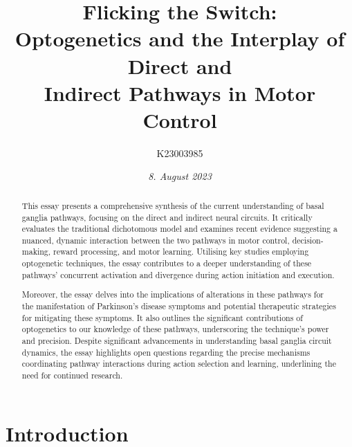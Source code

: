 \documentclass[10pt]{article}
\title{\textbf{Flicking the Switch: } \\ Optogenetics and the Interplay of Direct and \\ Indirect Pathways in Motor Control}
\author[ ]{K23003985}
\affil[ ]{\textbf{King’s College London}}
\affil[ ]{\href{mailto:K23003985@kcl.ac.uk}{K23003985@kcl.ac.uk}}
\date{\textit{8. August 2023}}
\begin{document}

\maketitle
\thispagestyle{empty}

\doublespacing

\begin{sloppypar} %
  \begin{abstract}
    This essay presents a comprehensive synthesis of the current understanding of basal ganglia pathways, focusing on the direct and indirect neural circuits. It critically evaluates the traditional dichotomous model and examines recent evidence suggesting a nuanced, dynamic interaction between the two pathways in motor control, decision-making, reward processing, and motor learning. Utilising key studies employing optogenetic techniques, the essay contributes to a deeper understanding of these pathways’ concurrent activation and divergence during action initiation and execution.

    Moreover, the essay delves into the implications of alterations in these pathways for the manifestation of Parkinson’s disease symptoms and potential therapeutic strategies for mitigating these symptoms. It also outlines the significant contributions of optogenetics to our knowledge of these pathways, underscoring the technique’s power and precision. Despite significant advancements in understanding basal ganglia circuit dynamics, the essay highlights open questions regarding the precise mechanisms coordinating pathway interactions during action selection and learning, underlining the need for continued research.
  \end{abstract}
  \pagebreak





  \section{Introduction}
  \label{sec:introduction}


\end{sloppypar}
\end{document}
